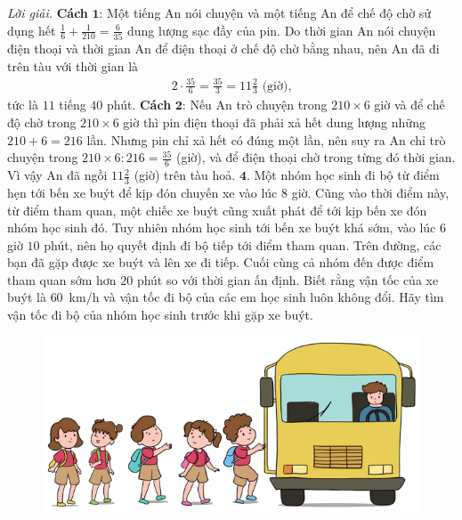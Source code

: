 \begin{multicols}{2}
\begin{figure}[H]
		\vspace*{-5pt}
	\end{figure}
	\textit{Lời giải.} \textbf{\color{toancuabi}Cách} $\pmb{1}$: Một tiếng An nói chuyện và một tiếng An để chế độ chờ sử dụng hết $\frac{1}{6} + \frac{1}{210} = \frac{6}{35}$ dung lượng sạc đầy của pin. 
	\vskip 0.1cm
	Do thời gian An nói chuyện điện thoại và thời gian An để điện thoại ở chế độ chờ bằng nhau, nên An đã đi trên tàu với thời gian là
	\begin{align*}
		2\cdot \frac{35}{6} = \frac{35}{3} = 11\frac{2}{3} \text{ (giờ),}
	\end{align*}
	tức là $11$ tiếng $40$ phút.
	\vskip 0.1cm
	\textbf{\color{toancuabi}Cách} $\pmb{2}$: Nếu An trò chuyện trong $210 \times 6$ giờ và để chế độ chờ trong $210\times 6$  giờ thì pin điện thoại đã phải xả hết dung lượng những $210+6 = 216$ lần. Nhưng pin chỉ xả hết có đúng một lần, nên suy ra An chỉ trò chuyện trong $210\times 6 : 216 = \frac{35}{6}$ (giờ), và để điện thoại chờ trong từng đó thời gian. Vì vậy An đã ngồi $11\frac{2}{3}$ (giờ) trên tàu hoả.
	\vskip 0.1cm
	$\pmb{4.}$ Một nhóm học sinh đi bộ từ điểm hẹn tới bến xe buýt để kịp đón chuyến xe vào lúc $8$ giờ. Cũng vào thời điểm này, từ điểm tham quan, một chiếc xe buýt cũng xuất phát để tới kịp bến xe đón nhóm học sinh đó. Tuy  nhiên nhóm học sinh tới bến xe buýt khá sớm, vào lúc $6$ giờ $10$ phút, nên họ quyết định đi bộ tiếp tới điểm tham quan. Trên đường, các bạn đã gặp được xe buýt và lên xe đi tiếp.  Cuối cùng cả nhóm đến được điểm tham quan sớm hơn $20$ phút so với thời gian ấn định. Biết rằng vận tốc của xe buýt là $60$~km/h và vận tốc đi bộ của các em học sinh luôn không đổi. Hãy tìm vận tốc đi bộ của nhóm học sinh trước khi gặp xe buýt.
	\begin{figure}[H]
		\centering
		\vspace*{-5pt}
		\captionsetup{labelformat= empty, justification=centering}
		\includegraphics[width=0.9\linewidth]{Pi5_bai4}
		\vspace*{-10pt}

\end{figure}
\end{multicols}

